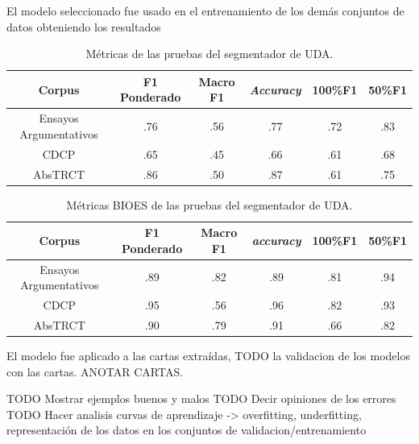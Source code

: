 El modelo seleccionado fue usado en el entrenamiento de los demás conjuntos de datos obteniendo los resultados

\begin{table}[h!]
	\begin{center}
		\begin{tabular}{|c|c|c|c|c|c|} \hline
        Corpus		            & F1 Ponderado  & Macro F1	& \emph{Accuracy} & 100\%F1 & 50\%F1  \\ \hline
        Ensayos Argumentativos  & .76           & .56 		& .77		      & .72	    & .83	       \\ \hline
        CDCP		            & .65           & .45 		& .66		      & .61	    & .68	       \\ \hline
        AbsTRCT	                & .86           & .50 		& .87		      & .61	    & .75	       \\ \hline
        \end{tabular}
	\caption{Métricas de las pruebas del segmentador de UDA.}\label{table:test_metrics_segmenter}
	\end{center}
\end{table}
\begin{table}[h!]
	\begin{center}
		\begin{tabular}{|c|c|c|c|c|c|} \hline
        Corpus		            & F1 Ponderado  & Macro F1 & \emph{accuracy} & 100\%F1 &  50\%F1   \\ \hline
        Ensayos Argumentativos  & .89           & .82	   & .89             & .81	   & .94 	   \\ \hline
        CDCP		            & .95           & .56	   & .96	         & .82	   & .93 	   \\ \hline
        AbsTRCT	                & .90           & .79	   & .91	         & .66	   & .82 	   \\ \hline
        \end{tabular}
	\caption{Métricas BIOES de las pruebas del segmentador de UDA.}\label{table:test_bioes_metrics_segmenter}
	\end{center}
\end{table}

El modelo fue aplicado a las cartas extraídas, TODO la validacion de los modelos con las cartas. ANOTAR CARTAS.

TODO Mostrar ejemplos buenos y malos
TODO Decir opiniones de los errores
TODO Hacer analisis curvas de aprendizaje -> overfitting, underfitting, representación de los datos en los conjuntos de validacion/entrenamiento

